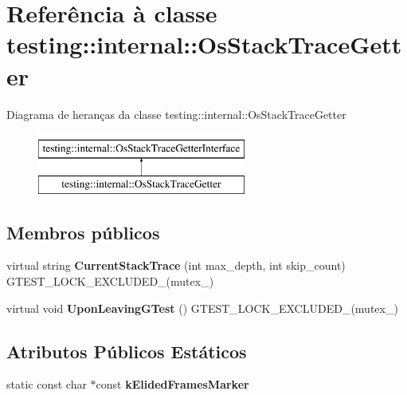 \hypertarget{classtesting_1_1internal_1_1OsStackTraceGetter}{\section{Referência à classe testing\-:\-:internal\-:\-:Os\-Stack\-Trace\-Getter}
\label{classtesting_1_1internal_1_1OsStackTraceGetter}
}
Diagrama de heranças da classe testing\-:\-:internal\-:\-:Os\-Stack\-Trace\-Getter\begin{figure}[H]
\begin{center}
\leavevmode
\includegraphics[height=2.000000cm]{classtesting_1_1internal_1_1OsStackTraceGetter}
\end{center}
\end{figure}
\subsection*{Membros públicos}
\begin{DoxyCompactItemize}
\item 
\hypertarget{classtesting_1_1internal_1_1OsStackTraceGetter_afe0f7539f1a325eec1adf0625bbdfbd7}{virtual string {\bfseries Current\-Stack\-Trace} (int max\-\_\-depth, int skip\-\_\-count) G\-T\-E\-S\-T\-\_\-\-L\-O\-C\-K\-\_\-\-E\-X\-C\-L\-U\-D\-E\-D\-\_\-(mutex\-\_\-)}\label{classtesting_1_1internal_1_1OsStackTraceGetter_afe0f7539f1a325eec1adf0625bbdfbd7}

\item 
\hypertarget{classtesting_1_1internal_1_1OsStackTraceGetter_abdfefeba8ffb0f1031491e4bd1a7fad9}{virtual void {\bfseries Upon\-Leaving\-G\-Test} () G\-T\-E\-S\-T\-\_\-\-L\-O\-C\-K\-\_\-\-E\-X\-C\-L\-U\-D\-E\-D\-\_\-(mutex\-\_\-)}\label{classtesting_1_1internal_1_1OsStackTraceGetter_abdfefeba8ffb0f1031491e4bd1a7fad9}

\end{DoxyCompactItemize}
\subsection*{Atributos Públicos Estáticos}
\begin{DoxyCompactItemize}
\item 
static const char $\ast$const {\bfseries k\-Elided\-Frames\-Marker}
\end{DoxyCompactItemize}


